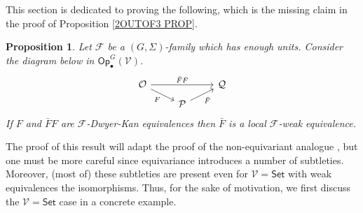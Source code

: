\documentclass[a4paper,10pt
,draft
]{article}%
\numberwithin{equation}{section}
\numberwithin{figure}{section}
\newtheorem{proposition}[equation]{Proposition}%
\theoremstyle{definition} %
\newcommand{\F}{\ensuremath{\mathcal F}}
\newcommand{\V}{\ensuremath{\mathcal V}}
\renewcommand{\O}{\ensuremath{\mathcal O}}
\newcommand{\1}{\ensuremath{\mathbbm 1}}%
\begin{document}
This section is dedicated to proving the following, 
which is the missing claim in the proof of Proposition \ref{2OUTOF3 PROP}.

\begin{proposition}\label{23HARDCASE PROP}
Let $\F$ be a $(G,\Sigma)$-family which has enough units. 
Consider the diagram below 
in $\mathsf{Op}^G_\bullet(\V)$.
\begin{equation}\label{23HARDDIAG EQ}
	\begin{tikzcd}[row sep=5pt]
		\O \arrow{rr}{\bar{F}F}
		\arrow{dr}[swap]{F}
	&&
		\mathcal{Q} 
	\\
	&
		\mathcal{P} \ar{ru}[swap]{\bar{F}}
	\end{tikzcd}
\end{equation}
If $F$ and $\bar{F}F$ are $\F$-Dwyer-Kan equivalences
then $\bar{F}$ is a local $\F$-weak equivalence.
\end{proposition}



The proof of this result will adapt the proof of the non-equivariant analogue \cite[Lemma 4.14]{Cav},
but one must be more careful since equivariance introduces a number of subtleties.
Moreover, (most of) these subtleties are
present even for $\V = \mathsf{Set}$
with weak equivalences the isomorphisms.
Thus, for the sake of motivation, 
we first discuss the $\V = \mathsf{Set}$ case
in a concrete example.
\end{document}
